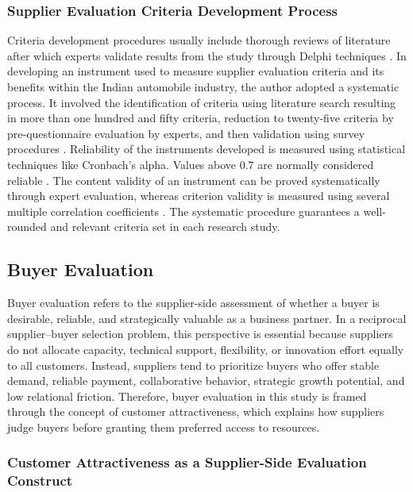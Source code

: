 \documentclass[11pt]{article}
\begin{document}
\subsubsection{Supplier Evaluation Criteria Development Process}

Criteria development procedures usually include thorough reviews of literature after which experts validate results from the study through Delphi techniques \cite{ref26,ref28}. In developing an instrument used to measure supplier evaluation criteria and its benefits within the Indian automobile industry, the author adopted a systematic process. It involved the identification of criteria using literature search resulting in more than one hundred and fifty criteria, reduction to twenty-five criteria by pre-questionnaire evaluation by experts, and then validation using survey procedures \cite{ref28}. Reliability of the instruments developed is measured using statistical techniques like Cronbach's alpha. Values above 0.7 are normally considered reliable \cite{ref28}. The content validity of an instrument can be proved systematically through expert evaluation, whereas criterion validity is measured using several multiple correlation coefficients \cite{ref28}. The systematic procedure guarantees a well-rounded and relevant criteria set in each research study.


\subsection{Buyer Evaluation}

Buyer evaluation refers to the supplier-side assessment of whether a buyer is desirable, reliable, and strategically valuable as a business partner. In a reciprocal supplier--buyer selection problem, this perspective is essential because suppliers do not allocate capacity, technical support, flexibility, or innovation effort equally to all customers. Instead, suppliers tend to prioritize buyers who offer stable demand, reliable payment, collaborative behavior, strategic growth potential, and low relational friction. Therefore, buyer evaluation in this study is framed through the concept of customer attractiveness, which explains how suppliers judge buyers before granting them preferred access to resources.

\subsubsection{Customer Attractiveness as a Supplier-Side Evaluation Construct}
\end{document}
